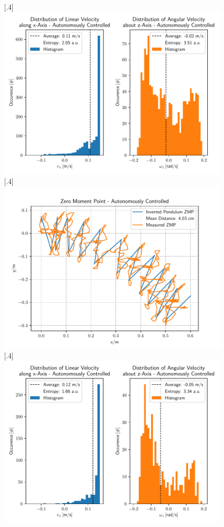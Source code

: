 \begin{figure}[h]
	[.4\linewidth]{\includegraphics[scale=.35]{chapters/05_experiments/02_autonomous_walking/curved_walk_01_entropy.pdf}}
	[.4\linewidth]{\includegraphics[scale=.35]{chapters/05_experiments/02_autonomous_walking/obstacle_walk_02_zmp.pdf}}
	[.4\linewidth]{\includegraphics[scale=.35]{chapters/05_experiments/02_autonomous_walking/obstacle_walk_02_entropy.pdf}}

\end{figure}
